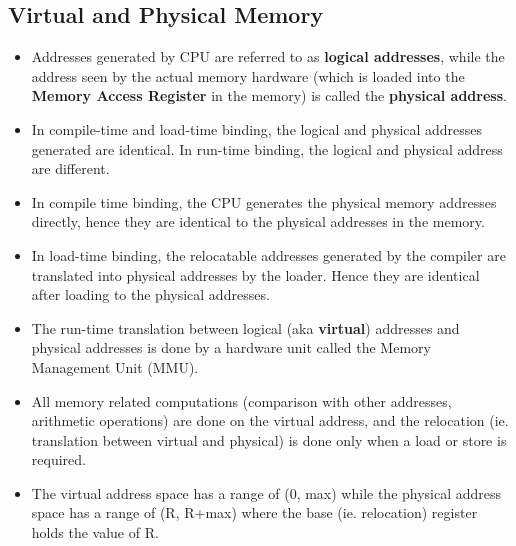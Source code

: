 \documentclass{article}
\theoremstyle{plain}
\theoremstyle{definition}
\begin{document}
\subsection{Virtual and Physical Memory}
\begin{itemize}
    \item Addresses generated by CPU are referred to as \textbf{logical addresses}, while the address seen by the actual memory hardware (which is loaded into the \textbf{Memory Access Register} in the memory) is called the \textbf{physical address}. 
    
    \item In compile-time and load-time binding, the logical and physical addresses generated are identical. In run-time binding, the logical and physical address are different. 
    
    \item In compile time binding, the CPU generates the physical memory addresses directly, hence they are identical to the physical addresses in the memory. 
    
    \item In load-time binding, the relocatable addresses generated by the compiler are translated into physical addresses by the loader. Hence they are identical after loading to the physical addresses. 
    
    \item The run-time translation between logical (aka \textbf{virtual}) addresses and physical addresses is done by a hardware unit called the Memory Management Unit (MMU).
    
    \item All memory related computations (comparison with other addresses, arithmetic operations) are done on the virtual address, and the relocation (ie. translation between virtual and physical) is done only when a load or store is required. 
    
    \item The virtual address space has a range of (0, max) while the physical address space has a range of (R, R+max) where the base (ie. relocation) register holds the value of R.
\end{itemize}
\end{document}
